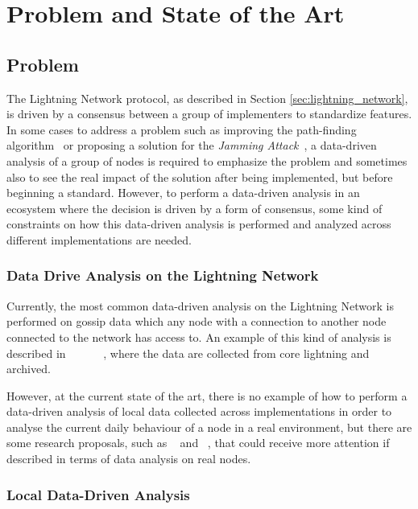 \chapter{Problem and State of the Art}\label{sec:problem_and_state_of_the_art}

\section{Problem}

The Lightning Network protocol, as described in Section \ref{sec:lightning_network}, is 
driven by a consensus between a group of implementers to standardize
features. In some cases to address a problem such as 
improving the path-finding algorithm~\cite{DBLP:journals/corr/abs-2103-08576} or 
proposing a solution for the \emph{Jamming Attack}~\cite{cryptoeprint:2022/1454}, 
a data-driven analysis of a group of nodes is required to emphasize the
problem and sometimes also to see the real impact of the solution after being 
implemented, but before beginning a standard.
However, to perform a data-driven analysis in an ecosystem where the decision
is driven by a form of consensus, some kind of 
constraints on how this data-driven analysis is performed and analyzed across 
different implementations are needed.

\subsection{Data Drive Analysis on the Lightning Network}

Currently, the most common data-driven analysis on the Lightning Network is performed 
on gossip data which any node  with a connection to another node connected 
to the network has access to. An example of this kind of analysis is described in ~\cite{lngossip} ~\cite{DBLP:conf/icdcn/ZabkaF0D21} ~\cite{DBLP:conf/networking/PietrzakS0Y21} ~\cite{DBLP:journals/corr/abs-2002-02819},
where the data are collected from core lightning and archived.

However, at the current state of the art, there is no example of how to perform
a data-driven analysis of local data collected across implementations in order to 
analyse the current daily behaviour of a node in a real environment, but there are some research proposals,  such as ~\cite{DBLP:journals/corr/abs-2103-08576} and ~\cite{cryptoeprint:2022/1454}, that could receive more attention if described  in terms 
of  data analysis on real nodes.


\subsection{Local Data-Driven Analysis}

